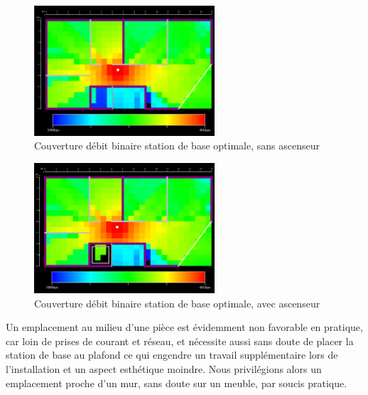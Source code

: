 \begin{figure}[H]
    \centering
    \includegraphics[width=0.6\textwidth]{latex/images/opti-without-lift.png}
    \caption{Couverture débit binaire station de base optimale, sans ascenseur}
    \label{fig:simu-emplacement-couloir-sansasc}
\end{figure}
\begin{figure}[H]
    \centering
    \includegraphics[width=0.6\textwidth]{latex/images/opti-with-lift.png}
    \caption{Couverture débit binaire station de base optimale, avec ascenseur}
    \label{fig:simu-emplacement-couloir-avecasc}
\end{figure}

Un emplacement au milieu d'une pièce est évidemment non favorable en pratique, car loin de prises de courant et réseau, et nécessite aussi sans doute de placer la station de base au plafond ce qui engendre un travail supplémentaire lors de l'installation et un aspect esthétique moindre. Nous privilégions alors un emplacement proche d'un mur, sans doute sur un meuble, par soucis pratique.


